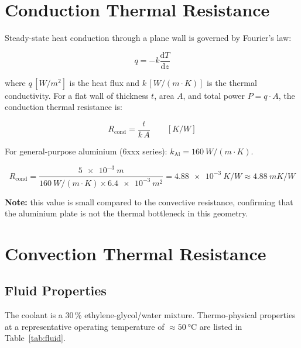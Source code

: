 \documentclass[a4paper,11pt]{article}
\begin{document}
\section{Conduction Thermal Resistance}

Steady-state heat conduction through a plane wall is governed by Fourier's law:

\begin{equation}
  q = -k \frac{\mathrm{d}T}{\mathrm{d}z}
\end{equation}

where $q\,[\si{W/m^2}]$ is the heat flux and $k\,[\si{W/(m\cdot K)}]$ is the
thermal conductivity. For a flat wall of thickness $t$, area $A$, and total power
$P = q\cdot A$, the conduction thermal resistance is:

\begin{equation}
  \boxed{R_{\mathrm{cond}} = \frac{t}{k\,A}}
  \qquad \left[\si{K/W}\right]
\end{equation}

For general-purpose aluminium (6xxx series):
$k_{\mathrm{Al}} = \SI{160}{W/(m\cdot K)}$.

\begin{equation}
  R_{\mathrm{cond}} = \frac{\SI{5e-3}{m}}{\SI{160}{W/(m\cdot K)} \times \SI{6.4e-3}{m^2}}
  = \SI{4.88e-3}{K/W} \approx \SI{4.88}{mK/W}
\end{equation}

\noindent\textbf{Note:} this value is small compared to the convective resistance,
confirming that the aluminium plate is not the thermal bottleneck in this geometry.

\section{Convection Thermal Resistance}

\subsection{Fluid Properties}

The coolant is a 30\,\% ethylene-glycol/water mixture.
Thermo-physical properties at a representative operating temperature of
$\approx\SI{50}{\celsius}$ are listed in Table~\ref{tab:fluid}.
\end{document}
